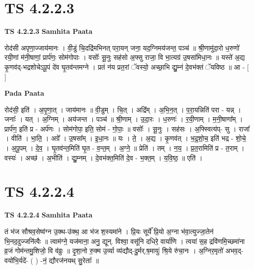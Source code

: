 \documentclass[17pt]{extarticle}
\begin{document}
\section*{ TS 4.2.2.3 }

\textbf{TS 4.2.2.3 } \newline
\textbf{Samhita Paata} \newline

रोद॑सी अपृणा॒ज्जाय॑मानः । वी॒डुं चि॒दद्रि॑मभिनत् परा॒यन् जना॒ यद॒ग्निमय॑जन्त॒ पञ्च॑ ॥ श्री॒णामु॑दा॒रो ध॒रुणो॑ रयी॒णां म॑नी॒षाणां॒ प्रार्प॑णः॒ सोम॑गोपाः । वसोः᳚ सू॒नुः सह॑सो अ॒फ्सु राजा॒ वि भा॒त्यग्र॑ उ॒षसा॑मिधा॒नः ॥ यस्ते॑ अ॒द्य कृ॒णव॑द्-भद्रशोचेऽपू॒पं दे॑व घृ॒तव॑न्तमग्ने । प्रतं न॑य प्रत॒रां ॅवस्यो॒ अच्छा॒भि द्यु॒म्नं दे॒वभ॑क्तं ॅयविष्ठ ॥ आ - [  ] \newline

\textbf{Pada Paata} \newline

रोद॑सी॒ इति॑ । अ॒पृ॒णा॒त् । जाय॑मानः ॥ वी॒डुम् । चि॒त् । अद्रि᳚म् । अ॒भि॒न॒त् । प॒रा॒यन्निति॑ परा - यन्न् । जनाः᳚ । यत् । अ॒ग्निम् । अय॑जन्त । पञ्च॑ ॥ श्री॒णाम् । उ॒दा॒रः । ध॒रुणः॑ । र॒यी॒णाम् । म॒नी॒षाणा᳚म् । प्रार्प॑ण॒ इति॑ प्र - अर्प॑णः । सोम॑गोपा॒ इति॒ सोम॑ - गो॒पाः॒ ॥ वसोः᳚ । सू॒नुः । सह॑सः । अ॒फ्स्वित्य॑प्- सु । राजा᳚ । वीति॑ । भा॒ति॒ । अग्रे᳚ । उ॒षसा᳚म् । इ॒धा॒नः ॥ यः । ते॒ । अ॒द्य । कृ॒णव॑त् । भ॒द्र॒शो॒च॒ इति॑ भद्र - शो॒चे॒ । अ॒पू॒पम् । दे॒व॒ । घृ॒तव॑न्त॒मिति॑ घृ॒त - व॒न्त॒म् । अ॒ग्ने॒ ॥ प्रेति॑ । तम् । न॒य॒ । प्र॒त॒रामिति॑ प्र - त॒राम् । वस्यः॑ । अच्छ॑ । अ॒भीति॑ । द्यु॒म्नम् । दे॒वभ॑क्त॒मिति॑ दे॒व - भ॒क्त॒म् । य॒वि॒ष्ठ॒ ॥ एति॑ ।  \newline




\section*{ TS 4.2.2.4 }

\textbf{TS 4.2.2.4 } \newline
\textbf{Samhita Paata} \newline

तं भ॑ज सौश्रव॒सेष्व॑ग्न उ॒क्थ-उ॑क्थ॒ आ भ॑ज श॒स्यमा॑ने । प्रि॒यः सूर्ये᳚ प्रि॒यो अ॒ग्ना भ॑वा॒त्युज्जा॒तेन॑ भि॒नद॒दुज्जनि॑त्वैः ॥ त्वाम॑ग्ने॒ यज॑माना॒ अनु॒ द्यून्. विश्वा॒ वसू॑नि दधिरे॒ वार्या॑णि । त्वया॑ स॒ह द्रवि॑णमि॒च्छमा॑ना व्र॒जं गोम॑न्तमु॒शिजो॒ वि व॑व्रुः ॥ दृ॒शा॒नो रु॒क्म उ॒र्व्या व्य॑द्यौद्-दु॒र्मर्.ष॒मायुः॑ श्रि॒ये रु॑चा॒नः । अ॒ग्निर॒मृतो॑ अभव॒द्-वयो॑भि॒र्यदे॑- ( ) -नं॒ द्यौरज॑नयथ् सु॒रेताः᳚ ॥ \newline
\end{document}
